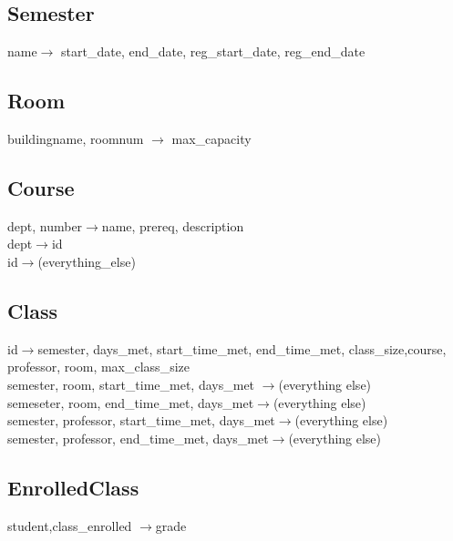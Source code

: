 \documentclass[11pt,oneside,a4paper]{article}
\begin{document}
\subsection{Semester}
\hspace{0.5in}name$\rightarrow$ start\_date, end\_date, reg\_start\_date, reg\_end\_date  


\subsection{Room}
\hspace*{0.5in}buildingname, roomnum $\rightarrow$ max\_capacity


\subsection{Course}
\hspace*{0.5in}dept, number$\rightarrow$name, prereq, description \\
\hspace*{0.5in}dept$\rightarrow$id \\
\hspace*{0.5in}id$\rightarrow$(everything\_else) 


\subsection{Class}
\hspace*{0.5in}id$\rightarrow$semester, days\_met, start\_time\_met, end\_time\_met, class\_size,course, professor, room, max\_class\_size \\
\hspace*{0.5in}semester, room, start\_time\_met, days\_met $\rightarrow$(everything else) \\
\hspace*{0.5in}semeseter, room, end\_time\_met, days\_met$\rightarrow$(everything else) \\
\hspace*{0.5in}semester, professor, start\_time\_met, days\_met$\rightarrow$(everything else) \\
\hspace*{0.5in}semester, professor, end\_time\_met, days\_met$\rightarrow$(everything else) 


\subsection{EnrolledClass}
\hspace*{0.5in}student,class\_enrolled $\rightarrow$grade
\end{document}
